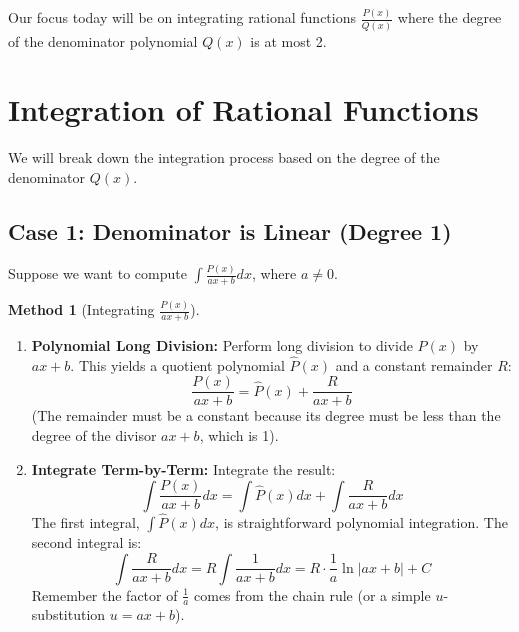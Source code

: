 \documentclass[11pt]{article}
\theoremstyle{plain}
\theoremstyle{definition}
\newtheorem{method}[theorem]{Method}
\theoremstyle{remark}
\newcommand{\abs}[1]{\left|#1\right|}
\begin{document}
Our focus today will be on integrating rational functions $\frac{P(x)}{Q(x)}$ where the degree of the denominator polynomial $Q(x)$ is at most 2.

\section{Integration of Rational Functions}

We will break down the integration process based on the degree of the denominator $Q(x)$.

\subsection{Case 1: Denominator is Linear (Degree 1)}

Suppose we want to compute $\int \frac{P(x)}{ax+b} dx$, where $a \neq 0$.

\begin{method}[Integrating $\frac{P(x)}{ax+b}$]
\leavevmode
\begin{enumerate}
    \item \textbf{Polynomial Long Division:} Perform long division to divide $P(x)$ by $ax+b$. This yields a quotient polynomial $\hat{P}(x)$ and a constant remainder $R$:
    \[ \frac{P(x)}{ax+b} = \hat{P}(x) + \frac{R}{ax+b} \]
    (The remainder must be a constant because its degree must be less than the degree of the divisor $ax+b$, which is 1).
    \item \textbf{Integrate Term-by-Term:} Integrate the result:
    \[ \int \frac{P(x)}{ax+b} dx = \int \hat{P}(x) dx + \int \frac{R}{ax+b} dx \]
    The first integral, $\int \hat{P}(x) dx$, is straightforward polynomial integration. The second integral is:
    \[ \int \frac{R}{ax+b} dx = R \int \frac{1}{ax+b} dx = R \cdot \frac{1}{a} \ln\abs{ax+b} + C \]
    Remember the factor of $\frac{1}{a}$ comes from the chain rule (or a simple $u$-substitution $u=ax+b$).
\end{enumerate}
\end{method}
\end{document}
